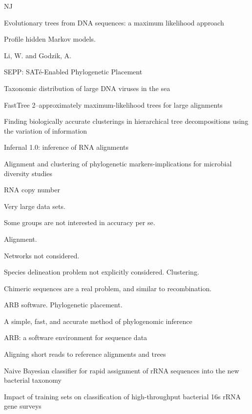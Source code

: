 \documentclass{amsart}
\begin{document}
NJ

\cite{felsenstein1981evolutionary}
{Evolutionary trees from DNA sequences: a maximum likelihood approach}

\cite{eddy1998profile}
Profile hidden Markov models.

\cite{li2006cdhit}
Li, W.  and Godzik, A.
\cite{edgar2010usearch}

\cite{mirarabsepp}
{SEPP: SAT{\'e}-Enabled Phylogenetic Placement}

\cite{monierEaLargeViruses08}
{Taxonomic distribution of large DNA viruses in the sea}

\cite{huson2007megan}

\cite{price2010fasttree}
{FastTree 2--approximately maximum-likelihood trees for large alignments}

\cite{navlakha2009finding}
Finding biologically accurate clusterings in hierarchical tree decompositions using the variation of information

\cite{nawrocki2009infernal}
Infernal 1.0: inference of RNA alignments

\cite{white2010alignment}
Alignment and clustering of phylogenetic markers-implications for microbial diversity studies

RNA copy number
\cite{morgan2010metagenomic}


Very large data sets.

Some groups are not interested in accuracy per se.

Alignment.

Networks not considered.

Species delineation problem not explicitly considered. Clustering.

Chimeric sequences are a real problem, and similar to recombination.

ARB software.
Phylogenetic placement.

\cite{wu2008simple}
A simple, fast, and accurate method of phylogenomic inference

\cite{matsen2010pplacer}

\cite{ludwig2004arb}
{{ARB}: a software environment for sequence data}
\cite{berger2011performance}

\cite{berger2011aligning}
Aligning short reads to reference alignments and trees


\cite{wang2007naive}
{Naive Bayesian classifier for rapid assignment of rRNA sequences into the new bacterial taxonomy}

\cite{werner2011impact}
Impact of training sets on classification of high-throughput bacterial 16s rRNA gene surveys
\end{document}
